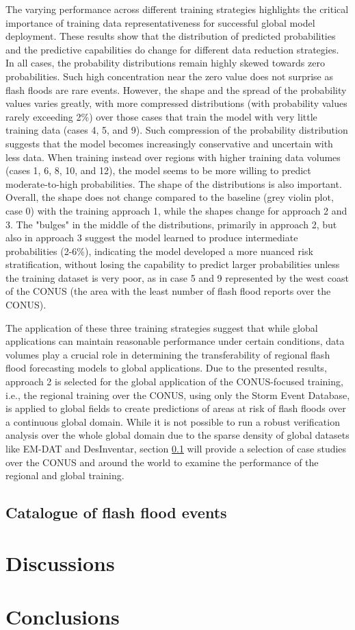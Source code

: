 The varying performance across different training strategies highlights the critical importance of training data representativeness for successful global model deployment. These results show that the distribution of predicted probabilities and the predictive capabilities do change for different data reduction strategies. In all cases, the probability distributions remain highly skewed towards zero probabilities. Such high concentration near the zero value does not surprise as flash floods are rare events. However, the shape and the spread of the probability values varies greatly, with more compressed distributions (with probability values rarely exceeding 2\%) over those cases that train the model with very little training data (cases 4, 5, and 9). Such compression of the probability distribution suggests that the model becomes increasingly conservative and uncertain with less data. When training instead over regions with higher training data volumes (cases 1, 6, 8, 10, and 12), the model seems to be more willing to predict moderate-to-high probabilities. The shape of the distributions is also important. Overall, the shape does not change compared to the baseline (grey violin plot, case 0) with the training approach 1, while the shapes change for approach 2 and 3. The "bulges" in the middle of the distributions, primarily in approach 2, but also in approach 3 suggest the model learned to produce intermediate probabilities (2-6\%), indicating the model developed a more nuanced risk stratification, without losing the capability to predict larger probabilities unless the training dataset is very poor, as in case 5 and 9 represented by the west coast of the CONUS (the area with the least number of flash flood reports over the CONUS). 

The application of these three training strategies suggest that while global applications can maintain reasonable performance under certain conditions, data volumes play a crucial role in determining the transferability of regional flash flood forecasting models to global applications. Due to the presented results, approach 2 is selected for the global application of the CONUS-focused training, i.e., the regional training over the CONUS, using only the Storm Event Database, is applied to global fields to create predictions of areas at risk of flash floods over a continuous global domain. While it is not possible to run a robust verification analysis over the whole global domain due to the sparse density of global datasets like EM-DAT and DesInventar, section \ref{verif_case_study} will provide a selection of case studies over the CONUS and around the world to examine the performance of the regional and global training.


\subsection{Catalogue of flash flood events}
\label{verif_case_study}


\section{Discussions}


\section{Conclusions}